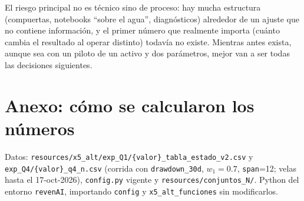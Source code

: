 \documentclass[11pt,a4paper]{article}
\newcommand{\code}[1]{\texttt{\small #1}}
\begin{document}
El riesgo principal no es técnico sino de proceso: hay mucha estructura (compuertas, notebooks
``sobre el agua'', diagnósticos) alrededor de un ajuste que no contiene información, y el primer número
que realmente importa (cuánto cambia el resultado al operar distinto) todavía no existe. Mientras antes
exista, aunque sea con un piloto de un activo y dos parámetros, mejor van a ser todas las decisiones
siguientes.

\section*{Anexo: cómo se calcularon los números}

Datos: \code{resources/x5\_alt/exp\_Q1/\{valor\}\_tabla\_estado\_v2.csv} y
\code{exp\_Q4/\{valor\}\_q4\_n.csv} (corrida con \code{drawdown\_30d}, $w_1=0.7$, \code{span}=12; velas
hasta el 17-oct-2026), \code{config.py} vigente y \code{resources/conjuntos\_N/}. Python del entorno
\code{revenAI}, importando \code{config} y \code{x5\_alt\_funciones} sin modificarlos.
\end{document}
